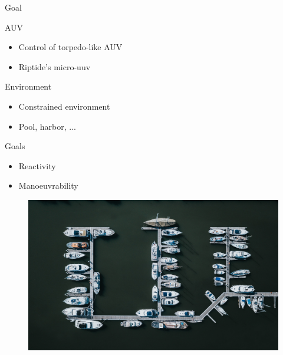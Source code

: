 \documentclass[10pt, xcolor={usenames, dvipsnames}]{beamer}
\begin{document}
        \begin{frame}{Goal}
            \begin{minipage}[c]{0.55\textwidth}
                \begin{block}{AUV}
                    \vspace{0.25cm}
                    \begin{itemize}
                        \item Control of torpedo-like AUV \\ 
                        \item Riptide's micro-uuv
                    \end{itemize}
                \end{block}
                \begin{block}{Environment}
                    \begin{itemize}
                        \item Constrained environment \\ 
                        \item Pool, harbor, ...
                    \end{itemize}
                \end{block}
                \begin{block}{Goals}
                    \begin{itemize}
                        \item Reactivity \\
                        \item Manoeuvrability
                    \end{itemize}
                \end{block}
            \end{minipage}
            \hfill
            \begin{minipage}[c]{0.4\textwidth}
                \begin{figure}[htb]
                    \includegraphics[width=\textwidth]{imgs/harbour.png}


\end{figure}
\end{minipage}
\end{frame}
\end{document}
